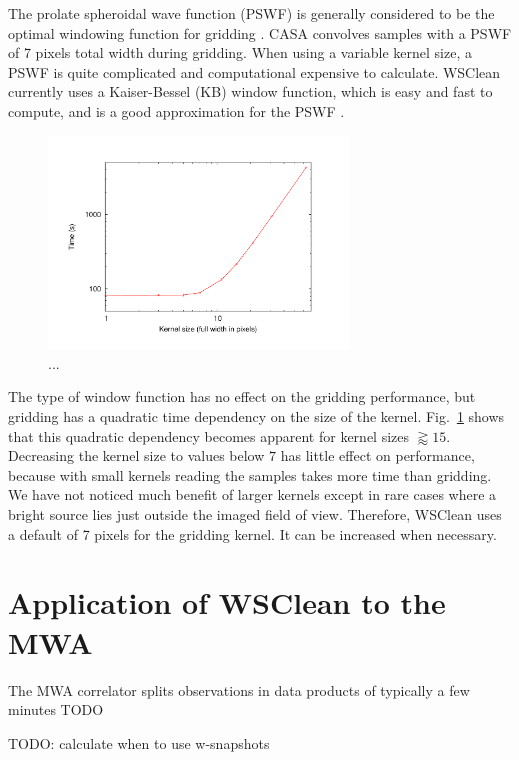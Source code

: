 \documentclass[useAMS,usenatbib]{mn2e}
\begin{document}
The prolate spheroidal wave function (PSWF) is generally considered to be the optimal windowing function for gridding \citep{fourier-kernel-selection-1991}. CASA convolves samples with a PSWF of 7 pixels total width during gridding. When using a variable kernel size, a PSWF is quite complicated and computational expensive to calculate. WSClean currently uses a Kaiser-Bessel (KB) window function, which is easy and fast to compute, and is a good approximation for the PSWF \citep{fourier-kernel-selection-1991}.

\begin{figure}
\begin{center}
\includegraphics[width=8cm]{img/benchmark-kernelsize/kernel}
\caption{...}
\label{fig:timing-kernelsize}
\end{center}
\end{figure}

The type of window function has no effect on the gridding performance, but gridding has a quadratic time dependency on the size of the kernel. Fig.~\ref{fig:timing-kernelsize} shows that this quadratic dependency becomes apparent for kernel sizes $\gtrapprox 15$. Decreasing the kernel size to values below $7$ has little effect on performance, because with small kernels reading the samples takes more time than gridding. We have not noticed much benefit of larger kernels except in rare cases where a bright source lies just outside the imaged field of view. Therefore, WSClean uses a default of 7 pixels for the gridding kernel. It can be increased when necessary.

\section{Application of WSClean to the MWA}
The MWA correlator splits observations in data products of typically a few minutes
TODO

TODO: calculate when to use w-snapshots
\end{document}
